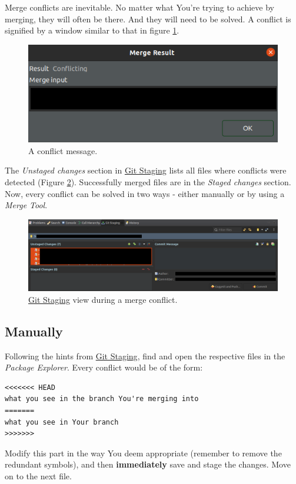 \documentclass{article}
\begin{document}
Merge conflicts are inevitable. No matter what You're trying to achieve by merging, they will often be there. And they will need to be solved. A conflict is signified by a window similar to that in figure \ref{fig:conflict_message}.

\begin{figure}[h]
	\centering
	\includegraphics[scale=0.6]{conflict_message.png}
	\caption{A conflict message.}
	\label{fig:conflict_message}
\end{figure}

The \textit{Unstaged changes} section in \hyperref[sec:git_staging]{Git Staging} lists all files where conflicts were detected (Figure \ref{fig:staging_conflicts}). Successfully merged files are in the \textit{Staged changes} section. Now, every conflict can be solved in two ways - either manually or by using a \textit{Merge Tool}.

\begin{figure}[h]
	\centering
	\includegraphics[scale=0.27]{staging_conflicts.png}
	\caption{\hyperref[sec:git_staging]{Git Staging} view during a merge conflict.}
	\label{fig:staging_conflicts}
\end{figure}

\subsection{Manually}
Following the hints from \hyperref[sec:git_staging]{Git Staging}, find and open the respective files in the \textit{Package Explorer}. Every conflict would be of the form:
\begin{verbatim}
<<<<<<< HEAD
what you see in the branch You're merging into
=======
what you see in Your branch
>>>>>>>
\end{verbatim}
Modify this part in the way You deem appropriate (remember to remove the redundant symbols), and then \textbf{immediately} save and stage the changes. Move on to the next file.
\end{document}
